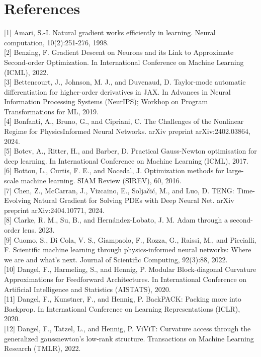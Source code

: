 \documentclass[10pt]{article}
\begin{document}
\section*{References}
[1] Amari, S.-I. Natural gradient works efficiently in learning. Neural computation, 10(2):251-276, 1998.\\[0pt]
[2] Benzing, F. Gradient Descent on Neurons and its Link to Approximate Second-order Optimization. In International Conference on Machine Learning (ICML), 2022.\\[0pt]
[3] Bettencourt, J., Johnson, M. J., and Duvenaud, D. Taylor-mode automatic differentiation for higher-order derivatives in JAX. In Advances in Neural Information Processing Systems (NeurIPS); Workhop on Program Transformations for ML, 2019.\\[0pt]
[4] Bonfanti, A., Bruno, G., and Cipriani, C. The Challenges of the Nonlinear Regime for PhysicsInformed Neural Networks. arXiv preprint arXiv:2402.03864, 2024.\\[0pt]
[5] Botev, A., Ritter, H., and Barber, D. Practical Gauss-Newton optimisation for deep learning. In International Conference on Machine Learning (ICML), 2017.\\[0pt]
[6] Bottou, L., Curtis, F. E., and Nocedal, J. Optimization methods for large-scale machine learning. SIAM Review (SIREV), 60, 2016.\\[0pt]
[7] Chen, Z., McCarran, J., Vizcaino, E., Soljačić, M., and Luo, D. TENG: Time-Evolving Natural Gradient for Solving PDEs with Deep Neural Net. arXiv preprint arXiv:2404.10771, 2024.\\[0pt]
[8] Clarke, R. M., Su, B., and Hernández-Lobato, J. M. Adam through a second-order lens. 2023.\\[0pt]
[9] Cuomo, S., Di Cola, V. S., Giampaolo, F., Rozza, G., Raissi, M., and Piccialli, F. Scientific machine learning through physics-informed neural networks: Where we are and what's next. Journal of Scientific Computing, 92(3):88, 2022.\\[0pt]
[10] Dangel, F., Harmeling, S., and Hennig, P. Modular Block-diagonal Curvature Approximations for Feedforward Architectures. In International Conference on Artificial Intelligence and Statistics (AISTATS), 2020.\\[0pt]
[11] Dangel, F., Kunstner, F., and Hennig, P. BackPACK: Packing more into Backprop. In International Conference on Learning Representations (ICLR), 2020.\\[0pt]
[12] Dangel, F., Tatzel, L., and Hennig, P. ViViT: Curvature access through the generalized gaussnewton's low-rank structure. Transactions on Machine Learning Research (TMLR), 2022.\\[0pt]
\end{document}
